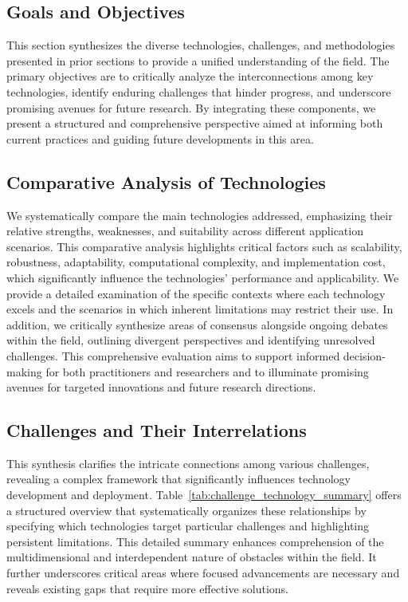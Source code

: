 \documentclass[sigconf]{acmart}
\begin{document}
\subsection{Goals and Objectives}
This section synthesizes the diverse technologies, challenges, and methodologies presented in prior sections to provide a unified understanding of the field. The primary objectives are to critically analyze the interconnections among key technologies, identify enduring challenges that hinder progress, and underscore promising avenues for future research. By integrating these components, we present a structured and comprehensive perspective aimed at informing both current practices and guiding future developments in this area.

\subsection{Comparative Analysis of Technologies}
We systematically compare the main technologies addressed, emphasizing their relative strengths, weaknesses, and suitability across different application scenarios. This comparative analysis highlights critical factors such as scalability, robustness, adaptability, computational complexity, and implementation cost, which significantly influence the technologies' performance and applicability. We provide a detailed examination of the specific contexts where each technology excels and the scenarios in which inherent limitations may restrict their use. In addition, we critically synthesize areas of consensus alongside ongoing debates within the field, outlining divergent perspectives and identifying unresolved challenges. This comprehensive evaluation aims to support informed decision-making for both practitioners and researchers and to illuminate promising avenues for targeted innovations and future research directions.

\subsection{Challenges and Their Interrelations}
This synthesis clarifies the intricate connections among various challenges, revealing a complex framework that significantly influences technology development and deployment. Table~\ref{tab:challenge_technology_summary} offers a structured overview that systematically organizes these relationships by specifying which technologies target particular challenges and highlighting persistent limitations. This detailed summary enhances comprehension of the multidimensional and interdependent nature of obstacles within the field. It further underscores critical areas where focused advancements are necessary and reveals existing gaps that require more effective solutions.
\end{document}
